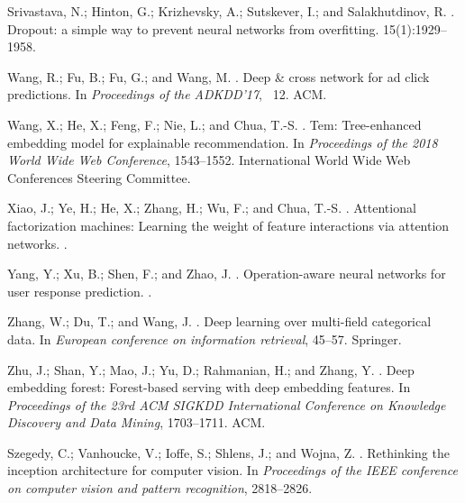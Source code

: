 \documentclass[sigconf]{acmart}
\begin{document}
\begin{thebibliography}{10}
Srivastava, N.; Hinton, G.; Krizhevsky, A.; Sutskever, I.; and Salakhutdinov,
  R.
.
\newblock Dropout: a simple way to prevent neural networks from overfitting.
 15(1):1929--1958.

Wang, R.; Fu, B.; Fu, G.; and Wang, M.
.
\newblock Deep \& cross network for ad click predictions.
\newblock In {\em Proceedings of the ADKDD'17}, ~12.
\newblock ACM.

Wang, X.; He, X.; Feng, F.; Nie, L.; and Chua, T.-S.
.
\newblock Tem: Tree-enhanced embedding model for explainable recommendation.
\newblock In {\em Proceedings of the 2018 World Wide Web Conference},
  1543--1552.
\newblock International World Wide Web Conferences Steering Committee.

Xiao, J.; Ye, H.; He, X.; Zhang, H.; Wu, F.; and Chua, T.-S.
.
\newblock Attentional factorization machines: Learning the weight of feature
  interactions via attention networks.
.

Yang, Y.; Xu, B.; Shen, F.; and Zhao, J.
.
\newblock Operation-aware neural networks for user response prediction.
.

Zhang, W.; Du, T.; and Wang, J.
.
\newblock Deep learning over multi-field categorical data.
\newblock In {\em European conference on information retrieval},  45--57.
\newblock Springer.

Zhu, J.; Shan, Y.; Mao, J.; Yu, D.; Rahmanian, H.; and Zhang, Y.
.
\newblock Deep embedding forest: Forest-based serving with deep embedding
  features.
\newblock In {\em Proceedings of the 23rd ACM SIGKDD International Conference
  on Knowledge Discovery and Data Mining},  1703--1711.
\newblock ACM.

Szegedy, C.; Vanhoucke, V.; Ioffe, S.; Shlens, J.; and Wojna, Z.
.
\newblock Rethinking the inception architecture for computer vision.
\newblock In {\em Proceedings of the IEEE conference on computer vision and
  pattern recognition},  2818--2826.


\end{thebibliography}
\end{document}
